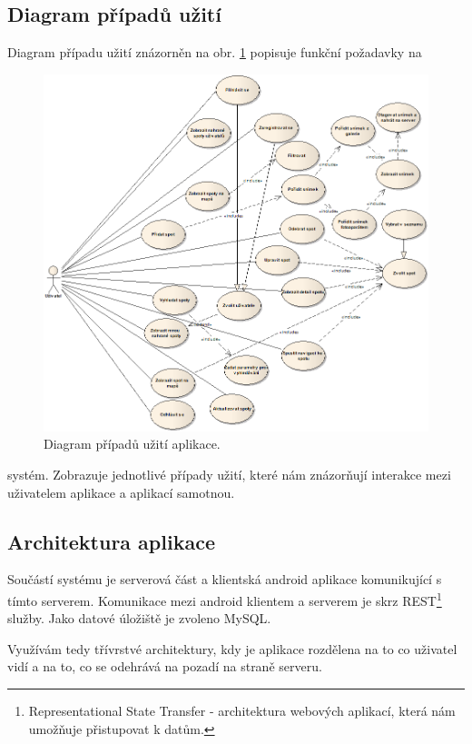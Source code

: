 \documentclass[12pt]{article}
\begin{document}
\subsection{Diagram případů užití}
Diagram případu užití znázorněn na obr. \ref{diagram} popisuje funkční požadavky na
\begin{figure}[ht]
\centerline{\includegraphics[scale=0.5]{images/spotting-diagram.png}}
\caption{Diagram případů užití aplikace.} \label{diagram}
\end{figure}
systém. Zobrazuje jednotlivé případy užití, které nám znázorňují interakce mezi uživatelem  aplikace a aplikací samotnou.
\subsection{Architektura aplikace}
Součástí systému je serverová část a klientská android aplikace komunikující s tímto serverem. Komunikace mezi android klientem a serverem je skrz REST\footnote[9]{Representational State Transfer - architektura webových aplikací, která nám umožňuje přistupovat k datům.} služby. Jako datové úložiště je zvoleno MySQL.

Využívám tedy třívrstvé architektury, kdy je aplikace rozdělena na to co uživatel vidí a na to, co se odehrává na pozadí na straně serveru.
\end{document}
